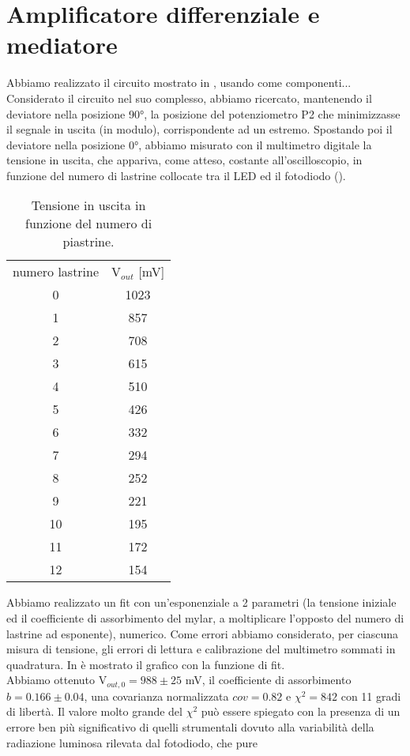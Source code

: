 \section{Amplificatore differenziale e mediatore}
Abbiamo realizzato il circuito mostrato in , usando come componenti...\\
Considerato il circuito nel suo complesso, abbiamo ricercato, mantenendo il deviatore nella posizione 90°, la posizione del potenziometro P2 che minimizzasse il segnale in uscita (in modulo), corrispondente ad un estremo. Spostando poi il deviatore nella posizione 0°, abbiamo misurato con il multimetro digitale la tensione in uscita, che appariva, come atteso, costante all'oscilloscopio, in funzione del numero di lastrine collocate tra il LED ed il fotodiodo ().
\begin{table}[h]
	\centering
	\begin{tabular}{cc}		
		{numero lastrine} & {V$_{out}$ [mV]}\\
                      0 & 1023\\
                      1 & 857\\
                      2 & 708\\
                      3 & 615\\
                      4 & 510\\
                      5 & 426\\
                      6 & 332\\
                      7 & 294\\
                      8 & 252\\
                      9 & 221\\
                     10 & 195\\
                     11 & 172\\
                     12 & 154\\
	           \midrule
	
 	\end{tabular}
	\caption{Tensione in uscita in funzione del numero di piastrine. }
	\label{t:Fotodiodo}
\end{table}
Abbiamo realizzato un fit con un'esponenziale a 2 parametri (la tensione iniziale ed il coefficiente di assorbimento del mylar, a moltiplicare l'opposto del numero di lastrine ad esponente), numerico. Come errori abbiamo considerato, per ciascuna misura di tensione, gli errori di lettura e calibrazione del multimetro sommati in quadratura. In  è mostrato il grafico con la funzione di fit.\\
Abbiamo ottenuto V$_{out,0} = 988 \pm 25$ mV, il coefficiente di assorbimento $b = 0.166 \pm 0.04$, una covarianza normalizzata $cov = 0.82$ e $\chi^2 = 842$ con 11 gradi di libertà. Il valore molto grande del $\chi^2$ può essere spiegato con la presenza di un errore ben più significativo di quelli strumentali dovuto alla variabilità della radiazione luminosa rilevata dal fotodiodo, che pure
